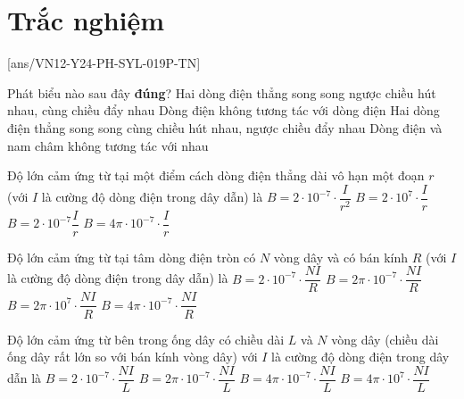 \let\lesson\undefined
\newcommand{\lesson}{\phantomlesson{Bài 10.}}
\let\lesson\undefined
\newcommand{\lesson}{\phantomlesson{Bài 10.}}


\setcounter{section}{2}
\section{Trắc nghiệm}
\setcounter{ex}{0}
[ans/VN12-Y24-PH-SYL-019P-TN]
\begin{ex}
	Phát biểu nào sau đây \textbf{đúng}?
	\choice
	{Hai dòng điện thẳng song song ngược chiều hút nhau, cùng chiều đẩy nhau}
	{Dòng điện không tương tác với dòng điện}
	{\True Hai dòng điện thẳng song song cùng chiều hút nhau, ngược chiều đẩy nhau}
	{Dòng điện và nam châm không tương tác với nhau}
	\loigiai{}
\end{ex}
\begin{ex}
Độ lớn cảm ứng từ tại một điểm cách dòng điện thẳng dài vô hạn một đoạn $r$ (với $I$ là cường độ dòng điện trong dây dẫn) là
	\choice
	{$B=2 \cdot 10^{-7}\cdot\dfrac{I}{r^2}$}
	{$B=2 \cdot 10^7 \cdot\dfrac{I}{r}$}
	{\True $B=2 \cdot 10^{-7} \dfrac{I}{r}$}
	{$B=4 \pi \cdot 10^{-7} \cdot\dfrac{I}{r}$}
	\loigiai{}
\end{ex}
\begin{ex}
	Độ lớn cảm ứng từ tại tâm dòng điện tròn có $N$ vòng dây và có bán kính $R$ (với $I$ là cường độ dòng điện trong dây dẫn) là
	\choice
	{$B=2 \cdot 10^{-7} \cdot\dfrac{NI}{R}$}
	{\True $B=2 \pi \cdot 10^{-7}\cdot \dfrac{NI}{R}$}
	{$B=2 \pi \cdot 10^7 \cdot\dfrac{NI}{R}$}
	{$B=4 \pi \cdot 10^{-7}\cdot \dfrac{NI}{R}$}
	\loigiai{}
\end{ex}
\begin{ex}
	Độ lớn cảm ứng từ bên trong ống dây có chiều dài $L$ và $N$ vòng dây (chiều dài ống dây rất lớn so với bán kính vòng dây) với $I$ là cường độ dòng điện trong dây dẫn là
	\choice
	{$B=2 \cdot 10^{-7} \cdot\dfrac{NI}{L}$}
	{$B=2 \pi \cdot 10^{-7} \cdot\dfrac{NI}{L}$}
	{\True $B=4 \pi \cdot 10^{-7}\cdot \dfrac{NI}{L}$}
	{$B=4 \pi \cdot 10^7\cdot \dfrac{NI}{L}$}
	\loigiai{}
\end{ex}

